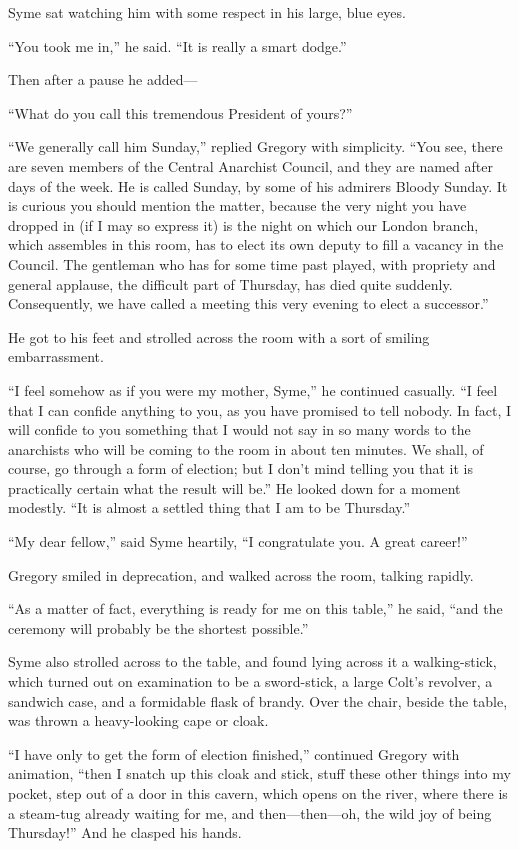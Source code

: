 \documentclass{book}
\begin{document}
Syme sat watching him with some respect in his large, blue eyes.

“You took me in,” he said. “It is really a smart dodge.”

Then after a pause he added—

“What do you call this tremendous President of yours?”

“We generally call him Sunday,” replied Gregory with simplicity. “You see, there are seven members of the Central Anarchist Council, and they are named after days of the week. He is called Sunday, by some of his admirers Bloody Sunday. It is curious you should mention the matter, because the very night you have dropped in (if I may so express it) is the night on which our London branch, which assembles in this room, has to elect its own deputy to fill a vacancy in the Council. The gentleman who has for some time past played, with propriety and general applause, the difficult part of Thursday, has died quite suddenly. Consequently, we have called a meeting this very evening to elect a successor.”

He got to his feet and strolled across the room with a sort of smiling embarrassment.

“I feel somehow as if you were my mother, Syme,” he continued casually. “I feel that I can confide anything to you, as you have promised to tell nobody. In fact, I will confide to you something that I would not say in so many words to the anarchists who will be coming to the room in about ten minutes. We shall, of course, go through a form of election; but I don’t mind telling you that it is practically certain what the result will be.” He looked down for a moment modestly. “It is almost a settled thing that I am to be Thursday.”

“My dear fellow,” said Syme heartily, “I congratulate you. A great career!”

Gregory smiled in deprecation, and walked across the room, talking rapidly.

“As a matter of fact, everything is ready for me on this table,” he said, “and the ceremony will probably be the shortest possible.”

Syme also strolled across to the table, and found lying across it a walking-stick, which turned out on examination to be a sword-stick, a large Colt’s revolver, a sandwich case, and a formidable flask of brandy. Over the chair, beside the table, was thrown a heavy-looking cape or cloak.

“I have only to get the form of election finished,” continued Gregory with animation, “then I snatch up this cloak and stick, stuff these other things into my pocket, step out of a door in this cavern, which opens on the river, where there is a steam-tug already waiting for me, and then—then—oh, the wild joy of being Thursday!” And he clasped his hands.
\end{document}
